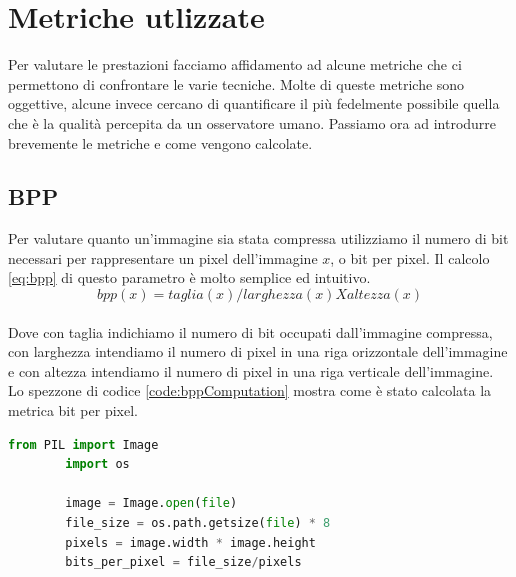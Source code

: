 \section{Metriche utlizzate}
Per valutare le prestazioni facciamo affidamento ad alcune metriche che ci permettono di confrontare le varie tecniche. Molte di queste metriche sono oggettive, alcune invece cercano di quantificare il più fedelmente possibile quella che è la qualità percepita da un osservatore umano.
Passiamo ora ad introdurre brevemente le metriche e come vengono calcolate.\\

\subsection{BPP}
Per valutare quanto un’immagine sia stata compressa utilizziamo il numero di bit necessari per rappresentare un pixel dell’immagine $x$, o bit per pixel. Il calcolo \ref{eq:bpp} di questo parametro è molto semplice ed intuitivo.\\
\begin{equation}\label{eq:bpp}
    bpp(x) = taglia (x) / larghezza (x) X altezza (x) 
\end{equation}\\
Dove con taglia indichiamo il numero di bit occupati dall’immagine compressa, con larghezza intendiamo il numero di pixel in una riga orizzontale dell’immagine e con altezza intendiamo il numero di pixel in una riga verticale dell’immagine.\\
Lo spezzone di codice \ref{code:bppComputation} mostra come è stato calcolata la metrica bit per pixel.\\
\begin{adjustbox}{max width=\textwidth}
    \begin{lstlisting}[language=Python, caption=Spezzone di codice per il calcolo dei bit per pixel, label=code:bppComputation]
        from PIL import Image
        import os
        
        image = Image.open(file)
        file_size = os.path.getsize(file) * 8
        pixels = image.width * image.height
        bits_per_pixel = file_size/pixels
    \end{lstlisting}
\end{adjustbox}

